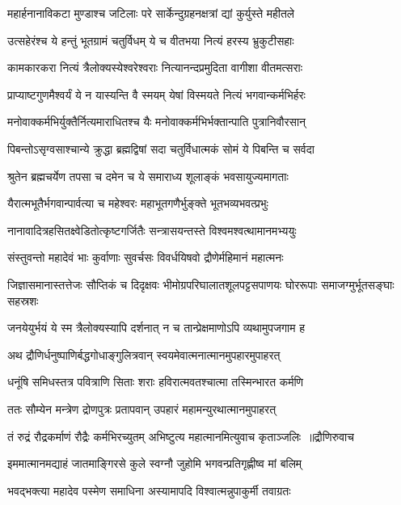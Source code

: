 \twolineshloka
{महार्हनानाविकटा मुण्डाश्च जटिलाः परे}
{सार्केन्दुग्रहनक्षत्रां द्यां कुर्युस्ते महीतले}


\twolineshloka
{उत्सहेरंश्च ये हन्तुं भूतग्रामं चतुर्विधम्}
{ये च वीतभया नित्यं हरस्य भ्रुकुटीसहाः}


\twolineshloka
{कामकारकरा नित्यं त्रैलोक्यस्येश्वरेश्वराः}
{नित्यानन्दप्रमुदिता वागीशा वीतमत्सराः}


\twolineshloka
{प्राप्याष्टगुणमैश्वर्यं ये न यास्यन्ति वै स्मयम्}
{येषां विस्मयते नित्यं भगवान्कर्मभिर्हरः}


\twolineshloka
{मनोवाक्कर्मभिर्युक्तैर्नित्यमाराधितश्च यैः}
{मनोवाक्कर्मभिर्भक्तान्पाति पुत्रानिवौरसान्}


\twolineshloka
{पिबन्तोऽसृग्वसाश्चान्ये क्रुद्धा ब्रह्मद्विषां सदा}
{चतुर्विधात्मकं सोमं ये पिबन्ति च सर्वदा}


\twolineshloka
{श्रुतेन ब्रह्मचर्येण तपसा च दमेन च}
{ये समाराध्य शूलाङ्कं भवसायुज्यमागताः}


\twolineshloka
{यैरात्मभूतैर्भगवान्पार्वत्या च महेश्वरः}
{महाभूतगणैर्भुङ्क्ते भूतभव्यभवत्प्रभुः}


\twolineshloka
{नानावादित्रहसितक्ष्वेडितोत्कृष्टगर्जितैः}
{सन्त्रासयन्तस्ते विश्वमश्वत्थामानमभ्ययुः}


\twolineshloka
{संस्तुवन्तो महादेवं भाः कुर्वाणाः सुवर्चसः}
{विवर्धयिषवो द्रौणेर्महिमानं महात्मनः}


\threelineshloka
{जिज्ञासमानास्तत्तेजः सौप्तिकं च दिदृक्षवः}
{भीमोग्रपरिघालातशूलपट्टसपाणयः}
{घोररूपाः समाजग्मुर्भूतसङ्घाः सहस्रशः}


\twolineshloka
{जनयेयुर्भयं ये स्म त्रैलोक्यस्यापि दर्शनात्}
{न च तान्प्रेक्षमाणोऽपि व्यथामुपजगाम ह}


\twolineshloka
{अथ द्रौणिर्धनुष्पाणिर्बद्धगोधाङ्गुलित्रवान्}
{स्वयमेवात्मनात्मानमुपहारमुपाहरत्}


\twolineshloka
{धनूंषि समिधस्तत्र पवित्राणि सिताः शराः}
{हविरात्मवतश्चात्मा तस्मिन्भारत कर्मणि}


\twolineshloka
{ततः सौम्येन मन्त्रेण द्रोणपुत्रः प्रतापवान्}
{उपहारं महामन्युरथात्मानमुपाहरत्}


\threelineshloka
{तं रुद्रं रौद्रकर्माणं रौद्रैः कर्मभिरच्युतम्}
{अभिष्टुत्य महात्मानमित्युवाच कृताञ्जलिः ॥द्रौणिरुवाच}
{}


\twolineshloka
{इममात्मानमद्याहं जातमाङ्गिरसे कुले}
{स्वग्नौ जुहोमि भगवन्प्रतिगृह्णीष्व मां बलिम्}


\twolineshloka
{भवद्भक्त्या महादेव पस्मेण समाधिना}
{अस्यामापदि विश्वात्मन्नुपाकुर्मी तवाग्रतः}


